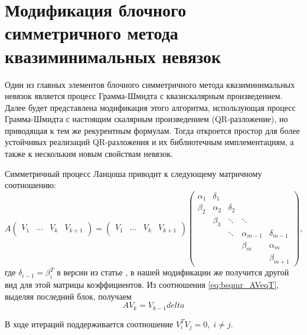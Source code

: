 \section{Модификация блочного симметричного метода квазиминимальных невязок}
\label{sec:bsqmr_mod} 

\par Один из главных элементов блочного симметричного метода квазиминимальных невязок \cite{doi:10.1137/0917019}
является процесс Грамма-Шмидта с квазискалярным произведением. Далее будет представлена модификация 
этого алгоритма, использующая процесс Грамма-Шмидта с настоящим скалярным произведением (QR-разложение), но
приводящая к тем же рекурентным формулам. Тогда откроется простор для более устойчивых реализаций
QR-разложения и их библиотечным имплементациям, а также к нескольким новым свойствам невязок.

\par Симметричный процесс Ланцоша приводит к следующему матричному соотношению:
\begin{equation}
    \label{eq:bsqmr_AVeqT}
    A \begin{pmatrix}
        V_1 & ... & V_k & V_{k+1} 
    \end{pmatrix} = \begin{pmatrix}
        V_1 & ... & V_k & V_{k+1} 
    \end{pmatrix} \begin{pmatrix}
        \alpha_1 & \delta_1 & & & \\
        \beta_2 & \alpha_2 & \delta_2 & & \\
        & \beta_3 & \ddots & \ddots & \\
        & & \ddots & \alpha_{m-1} & \delta_{m-1} \\
        & & & \beta_m & \alpha_m \\
        & & & & \beta_{m+1}
    \end{pmatrix},
\end{equation} 
где $\delta_{i-1} = \beta_i^T$ в версии из статье \cite{doi:10.1137/0917019}, в нашей
модификации же получится другой вид для этой матрицы коэффициентов. Из соотношения 
\eqref{eq:bsqmr_AVeqT}, выделяя последний блок, получаем 
\begin{equation}
    AV_k = V_{k-1}delta
\end{equation}

В ходе итераций поддерживается соотношение $V_i^TV_j=0,\;i \neq j$. 

\newpage
   